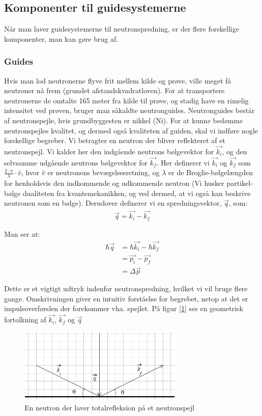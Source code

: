 \documentclass[12pt,oneside,a4paper]{article}
\begin{document}
{{{{{\subsection{Komponenter til guidesystemerne}
Når man laver guidesystemerne til neutronspredning, er der flere forskellige komponenter, man kan gøre brug af.

\subsubsection{Guides}

Hvis man lod neutronerne flyve frit mellem kilde og prøve, ville meget få neutroner nå frem (grundet afstandskvadratloven). For at transportere neutronerne de omtalte 165 meter fra kilde til prøve, og stadig have en rimelig intensitet ved prøven, bruger man såkaldte neutronguides. Neutronguides består af neutronspejle, hvis grundbyggesten er nikkel (Ni).
For at kunne bedømme neutronspejles kvalitet, og dermed også kvaliteten af guiden, skal vi indføre nogle forskellige begreber. Vi betragter en neutron der bliver reflekteret af et neutronspejl. Vi kalder her den indgående neutrons bølgevektor for $\vec{k_i}$, og den selvsamme udgående neutrons bølgevektor for  $\vec{k_f}$. Her definerer vi $\vec{k_i}$ og $\vec{k_f}$ som  $ {\frac{2 \cdot \pi}{\lambda}} \cdot \hat{v}$, hvor $\hat{v}$ er neutronens bevægelsesretning, og $\lambda$ er de Broglie-bølgelængden for henholdsvis den indkommende og udkommende neutron (Vi husker partikel-bølge dualiteten fra kvantemekanikken, og ved dermed, at vi også kan beskrive neutronen som en bølge). Derudover definerer vi en spredningsvektor, $\vec{q}$, som:
\begin{align}
\vec{q}=\vec{k_i}-\vec{k_f}
\end{align}

Man ser at:
\begin{align}
\hbar \vec{q} & = \hbar \vec{k_i} - \hbar \vec{k_f} \\ 
          & = \vec{p_i} - \vec{p_f} \\ 
          & = \Delta \vec{p}
\end{align}

Dette er et vigtigt udtryk indenfor neutronspredning, hvilket vi vil bruge flere gange. Omskrivningen giver en intuitiv forståelse for begrebet, netop at det er impulsoverførslen der forekommer vha. spejlet. På figur [\ref{neutronspejl}] ses en geometrisk fortolkning af $\vec{k_i}$, $\vec{k_f}$  og $ \vec{q}$

\begin{figure}[H]
\centering
\includegraphics[width=0.7\textwidth]{billederjaer.png}
\caption{En neutron der laver totalrefleksion på et neutronspejl} \label{neutronspejl}
\end{figure}

}}}}}
\end{document}

